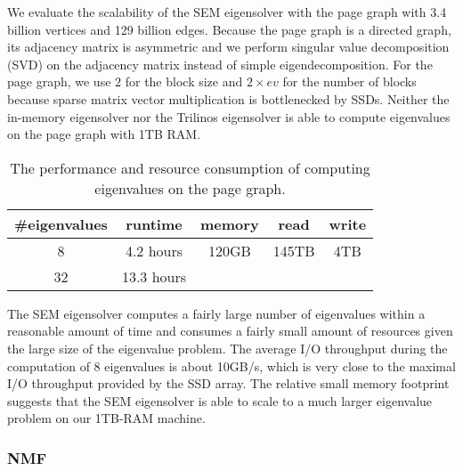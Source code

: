 %		

We evaluate the scalability of the SEM eigensolver with the page graph with 3.4 billion
vertices and 129 billion edges. Because the page graph is a directed graph,
its adjacency matrix is asymmetric and we perform singular value decomposition
(SVD) on the adjacency matrix instead of simple eigendecomposition. For the page
graph, we use $2$ for the block size and $2 \times ev$ for the number of blocks
because sparse matrix vector multiplication is bottlenecked by SSDs.
Neither the in-memory eigensolver nor the Trilinos eigensolver is able
to compute eigenvalues on the page graph with 1TB RAM.

\begin{table}
	\begin{center}
		\small
		\begin{tabular}{|c|c|c|c|c|}
			\hline
			\#eigenvalues & runtime & memory & read & write \\
			\hline
			8 & 4.2 hours & 120GB & 145TB & 4TB \\
			\hline
			32 & 13.3 hours &  &  & \\
			\hline
		\end{tabular}
		\normalsize
	\end{center}
	\caption{The performance and resource consumption of computing eigenvalues
	on the page graph.}
	\label{pg_ev}
\end{table}

The SEM eigensolver computes a fairly large number of eigenvalues within a reasonable
amount of time and consumes a fairly small amount of resources given the large
size of the eigenvalue problem.
The average I/O throughput during the computation of 8 eigenvalues is about
10GB/s, which is very close to the maximal I/O throughput provided by
the SSD array. The relative small memory footprint suggests that the SEM
eigensolver is able to scale to a much larger eigenvalue problem on our
1TB-RAM machine.

\subsubsection{NMF}
